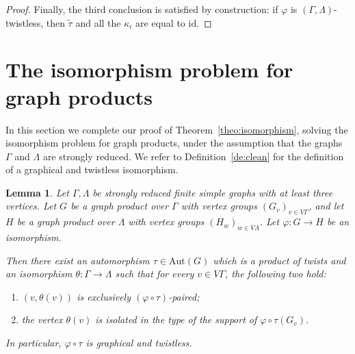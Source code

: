 \documentclass[a4paper,english,11pt]{article}
\newtheorem{lemma}[de]{Lemma}
\theoremstyle{definition}
\theoremstyle{remark}
\newcommand{\Aut}{\mathrm{Aut}}
\begin{document}
\begin{proof}
Finally, the third conclusion is satisfied by construction: if $\varphi$ is $(\Gamma,\Lambda)$-twistless, then $\tilde{\tau}$ and all the $\kappa_i$ are equal to $\mathrm{id}$. 
\end{proof}

\section{The isomorphism problem for graph products}\label{sec:endgame-isomorphism}

In this section we complete our proof of Theorem~\ref{theo:isomorphism}, solving the isomorphism problem for graph products, under the assumption that the graphs $\Gamma$ and $\Lambda$ are strongly reduced. We refer to Definition~\ref{de:clean} for the definition of a graphical and twistless isomorphism.

\begin{lemma}\label{lemma:endgame}
Let $\Gamma,\Lambda$ be strongly reduced finite simple graphs with at least three vertices. Let $G$ be a graph product over $\Gamma$ with vertex groups $(G_v)_{v\in V\Gamma}$, and let $H$ be a graph product over $\Lambda$ with vertex groups $(H_w)_{w\in V\Lambda}$. Let $\varphi:G\to H$ be an isomorphism. 

Then there exist an automorphism $\tau\in\Aut(G)$ which is a product of twists and an isomorphism $\theta:\Gamma\to\Lambda$ such that for every $v\in V\Gamma$, the following two hold: 
\begin{enumerate}
    \item\label{cond:theta1} $(v,\theta(v))$ is exclusively $(\varphi\circ\tau)$-paired;
    \item\label{cond:theta2} the vertex $\theta(v)$ is isolated in the type of the support of $\varphi\circ\tau(G_v)$.
\end{enumerate}
In particular, $\varphi\circ\tau$ is graphical and twistless.
\end{lemma}
\end{document}
